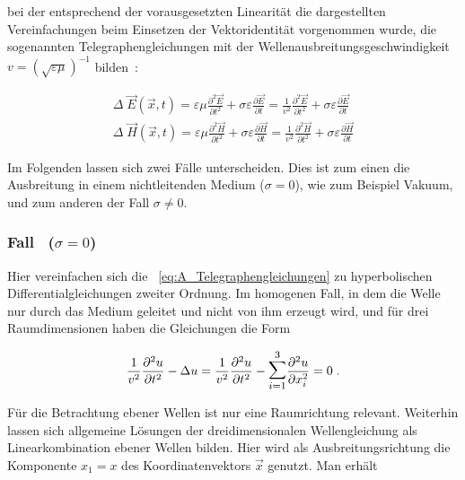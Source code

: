 bei der entsprechend der vorausgesetzten Linearität die dargestellten Vereinfachungen beim Einsetzen der Vektoridentität vorgenommen wurde, die sogenannten Telegraphengleichungen mit der Wellenausbreitungsgeschwindigkeit $v =(\sqrt{\varepsilon \mu})^{-1}$ bilden~\cite{EM_Schirmung}:

\begin{subequations}
    \label{eq:A_Telegraphengleichungen}
    \begin{align}
        \Delta \; \vec E(\vec x,t) = \varepsilon \mu \frac{\partial ^2 \vec E}{\partial t^2} + \sigma \varepsilon \frac{\partial  \vec E}{\partial t}  = \frac{1}{v^2} \frac{\partial ^2 \vec E}{\partial t^2} + \sigma \varepsilon \frac{\partial  \vec E}{\partial t} \label{subeq:A_Telegraphengleichungen1}\\
        \Delta \; \vec H(\vec x,t) = \varepsilon \mu \frac{\partial ^2 \vec H}{\partial t^2} + \sigma \varepsilon \frac{\partial  \vec H}{\partial t} = \frac{1}{v^2} \frac{\partial ^2 \vec H}{\partial t^2} + \sigma \varepsilon \frac{\partial  \vec H}{\partial t}  \label{subeq:A_Telegraphengleichungen2}
    \end{align}
\end{subequations}

Im Folgenden lassen sich zwei Fälle unterscheiden. Dies ist zum einen die Ausbreitung in einem nichtleitenden Medium ($\sigma = 0$), wie zum Beispiel Vakuum, und zum anderen der Fall $\sigma \neq 0$. 

\subsubsection{Fall~ ($\sigma = 0$)}

Hier vereinfachen sich die \Gleichungen~\eqref{eq:A_Telegraphengleichungen} zu hyperbolischen Differentialgleichungen zweiter Ordnung. Im homogenen Fall, in dem die Welle nur durch das Medium geleitet und nicht von ihm erzeugt wird, und für drei Raumdimensionen haben die Gleichungen die Form

\begin{equation}
     \frac{1}{v^2}\frac{\partial ^2 u}{\partial t^2} - \Delta u = \frac{1}{v^2}\frac{\partial ^2 u}{\partial t^2} -  \mathlarger{\mathlarger{\sum}}_{i=1}^3 \frac{\partial^2 u}{\partial x_i^2} = 0   \; \text{.}
\end{equation}

Für die Betrachtung ebener Wellen ist nur eine Raumrichtung relevant. Weiterhin lassen sich allgemeine Lösungen der dreidimensionalen Wellengleichung als Linearkombination ebener Wellen bilden. Hier wird als Ausbreitungsrichtung die Komponente $x_1 = x$ des Koordinatenvektors $\vec x$ genutzt. Man erhält

